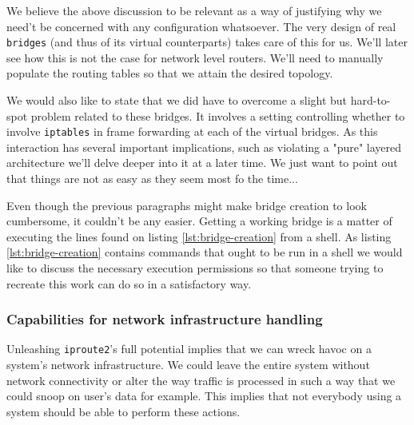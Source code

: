             We believe the above discussion to be relevant as a way of justifying why we need't be concerned with any configuration whatsoever. The very design of real \texttt{bridges} (and thus of its virtual counterparts) takes care of this for us. We'll later see how this is not the case for network level routers. We'll need to manually populate the routing tables so that we attain the desired topology.

            We would also like to state that we did have to overcome a slight but hard-to-spot problem related to these bridges. It involves a setting controlling whether to involve \texttt{iptables} in frame forwarding at each of the virtual bridges. As this interaction has several important implications, such as violating a "pure" layered architecture we'll delve deeper into it at a later time. We just want to point out that things are not as easy as they seem most fo the time...

            Even though the previous paragraphs might make bridge creation to look cumbersome, it couldn't be any easier. Getting a working bridge is a matter of executing the lines found on listing \ref{lst:bridge-creation} from a shell. As listing \ref{lst:bridge-creation} contains commands that ought to be run in a shell we would like to discuss the necessary execution permissions so that someone trying to recreate this work can do so in a satisfactory way.

            \subsubsection{Capabilities for network infrastructure handling}
                Unleashing \texttt{iproute2}'s full potential implies that we can wreck havoc on a system's network infrastructure. We could leave the entire system without network connectivity or alter the way traffic is processed in such a way that we could snoop on user's data for example. This implies that not everybody using a system should be able to perform these actions.


